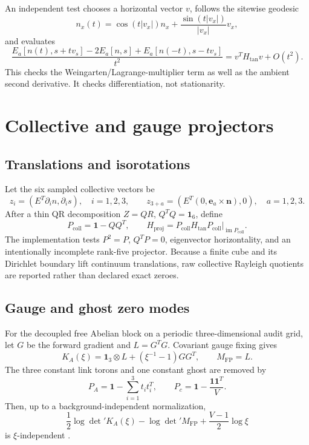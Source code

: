 \documentclass[11pt]{article}
\theoremstyle{definition}
\theoremstyle{remark}
\newcommand{\one}{\mathbf 1}
\begin{document}
An independent test chooses a horizontal vector \(v\), follows the sitewise
geodesic
\[
 n_x(t)=\cos(t|v_x|)n_x+\frac{\sin(t|v_x|)}{|v_x|}v_x,
\]
and evaluates
\begin{equation}
 \frac{E_a[n(t),s+tv_s]-2E_a[n,s]+E_a[n(-t),s-tv_s]}{t^2}
 =v^TH_{\mathrm{tan}}v+O(t^2).
 \label{eq:directional-check}
\end{equation}
This checks the Weingarten/Lagrange-multiplier term as well as the ambient
second derivative.  It checks differentiation, not stationarity.

\section{Collective and gauge projectors}

\subsection{Translations and isorotations}

Let the six sampled collective vectors be
\begin{equation}
 z_i=(E^T\partial_i n,\partial_i s),\quad i=1,2,3,
 \qquad
 z_{3+a}=(E^T(0,\bm e_a\times\bm n),0),\quad a=1,2,3.
 \label{eq:collective}
\end{equation}
After a thin QR decomposition \(Z=QR\), \(Q^TQ=\one_6\), define
\begin{equation}
 P_{\mathrm{coll}}=\one-QQ^T,\qquad
 H_{\mathrm{proj}}=P_{\mathrm{coll}}H_{\mathrm{tan}}P_{\mathrm{coll}}
 \big|_{\operatorname{im}P_{\mathrm{coll}}}.
 \label{eq:collective-projector}
\end{equation}
The implementation tests \(P^2=P\), \(Q^TP=0\), eigenvector horizontality,
and an intentionally incomplete rank-five projector.  Because a finite cube
and its Dirichlet boundary lift continuum translations, raw collective
Rayleigh quotients are reported rather than declared exact zeroes.

\subsection{Gauge and ghost zero modes}

For the decoupled free Abelian block on a periodic three-dimensional audit
grid, let \(G\) be the forward gradient and \(L=G^TG\).  Covariant gauge
fixing gives
\begin{equation}
 K_A(\xi)=\one_3\otimes L+(\xi^{-1}-1)GG^T,\qquad M_{\mathrm{FP}}=L.
 \label{eq:gauge-ghost}
\end{equation}
The three constant link torons and one constant ghost are removed by
\begin{equation}
 P_A=\one-\sum_{i=1}^3t_it_i^T,\qquad
 P_c=\one-\frac{\bm1\bm1^T}{V}.
 \label{eq:gauge-projectors}
\end{equation}
Then, up to a background-independent normalization,
\begin{equation}
 \frac12\log\det{}'K_A(\xi)-\log\det{}'M_{\mathrm{FP}}
 +\frac{V-1}{2}\log\xi
\end{equation}
is \(\xi\)-independent \cite{FaddeevPopov1967APE6}.
\end{document}
